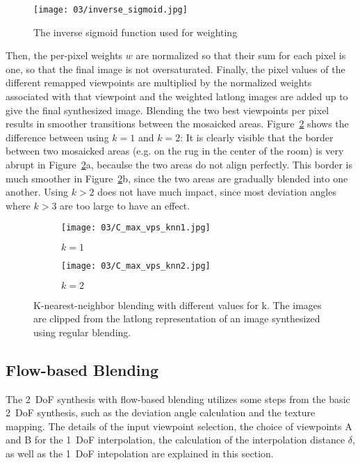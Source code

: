 \begin{figure}
		\centering
		\texttt{[image: 03/inverse\_sigmoid.jpg]}
		\caption{The inverse sigmoid function used for weighting}
		\label{fig:sigmoid}
\end{figure}

Then, the per-pixel weights $w$ are normalized so that their sum for each pixel is one, so that the final image is not oversaturated. Finally, the pixel values of the different remapped viewpoints are multiplied by the normalized weights associated with that viewpoint and the weighted latlong images are added up to give the final synthesized image. Blending the two best viewpoints per pixel results in smoother transitions between the mosaicked areas. Figure~\ref{fig:knn} shows the difference between using $k=1$ and $k=2$: It is clearly visible that the border between two mosaicked areas (e.g. on the rug in the center of the room) is very abrupt in Figure~\ref{fig:knn}a, becaulse the two areas do not align perfectly. This border is much smoother in Figure~\ref{fig:knn}b, since the two areas are gradually blended into one another. Using $k>2$ does not have much impact, since most deviation angles where $k>3$ are too large to have an effect.

\begin{figure}
\centering
    \hfill
    \begin{subfigure}[t]{0.5\textwidth}
            \centering
            \texttt{[image: 03/C\_max\_vps\_knn1.jpg]}
            \caption{$k=1$}
    \end{subfigure}%
    \hfill
    \begin{subfigure}[t]{0.5\textwidth}
            \centering
            \texttt{[image: 03/C\_max\_vps\_knn2.jpg]}
            \caption{$k=2$}
    \end{subfigure}
    \hfill
  \caption[K-nearest-neighbor blending with different values for k]{K-nearest-neighbor blending with different values for k. The images are clipped from the latlong representation of an image synthesized using regular blending.} \label{fig:knn}
\end{figure}

\subsection{Flow-based Blending}
The 2~DoF synthesis with flow-based blending utilizes some steps from the basic 2~DoF synthesis, such as the deviation angle calculation and the texture mapping. The details of the input viewpoint selection, the choice of viewpoints A and B for the 1~DoF interpolation, the calculation of the interpolation distance $\delta$, as well as the 1~DoF intepolation are explained in this section. 

